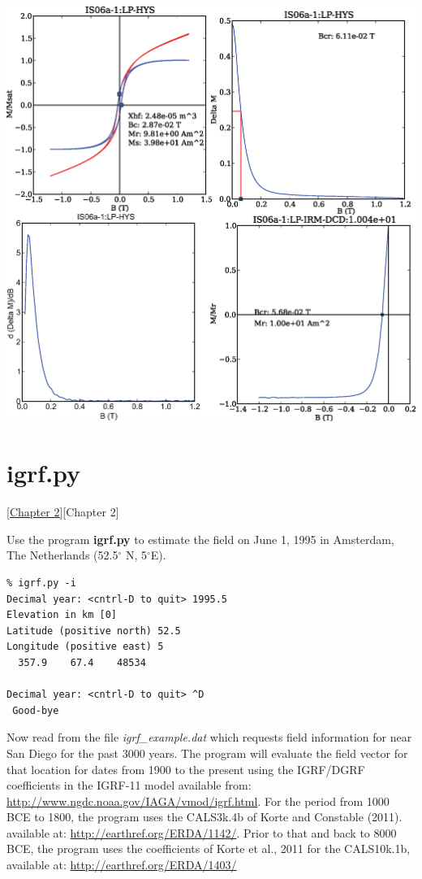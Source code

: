 \documentclass[11pt]{book}
\begin{document}
{{{  \includegraphics[width=20 cm]{EPSfiles/hysteresis-magic.eps}




\section {\bf igrf.py} 
\href{http://Webbookcopy.html#The_geomagnetic_field}{[Chapter 2]}[Chapter 2]


Use the program {\bf igrf.py } to estimate the
field on June 1, 1995 in Amsterdam, The Netherlands (52.5$^{\circ}$ N, 5$^{\circ}$E).

\begin{verbatim}
% igrf.py -i
Decimal year: <cntrl-D to quit> 1995.5
Elevation in km [0] 
Latitude (positive north) 52.5
Longitude (positive east) 5
  357.9    67.4    48534
  
Decimal year: <cntrl-D to quit> ^D
 Good-bye
\end{verbatim}

Now read from the file {\it igrf\_example.dat} which requests field information for near San Diego for the past 3000 years.  The program will evaluate the field vector for that location for dates from 1900 to the present using the IGRF/DGRF coefficients in the IGRF-11 model available from:
\url{http://www.ngdc.noaa.gov/IAGA/vmod/igrf.html}.   For the period from 1000 BCE to 1800, the program uses the CALS3k.4b of Korte and Constable (2011).  \nocite{korte11a} available at: \url{http://earthref.org/ERDA/1142/}.    Prior to that and back to 8000 BCE, the program uses the coefficients of Korte et al., 2011 \nocite{korte11b} for the CALS10k.1b, available at:
\url{http://earthref.org/ERDA/1403/}

}}}
\end{document}
